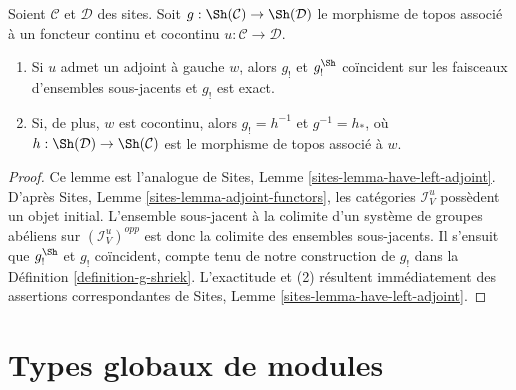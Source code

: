 \begin{lemma}
\label{lemma-have-left-adjoint}
Soient $\mathcal{C}$ et $\mathcal{D}$ des sites. Soit
$g : \Sh(\mathcal{C}) \to \Sh(\mathcal{D})$ le morphisme de topos associé à un
foncteur continu et cocontinu $u : \mathcal{C} \to \mathcal{D}$.
\begin{enumerate}
\item Si $u$ admet un adjoint à gauche $w$, alors $g_!$ et $g_!^{\Sh}$
coïncident sur les faisceaux d'ensembles sous-jacents et $g_!$ est exact.
\item Si, de plus, $w$ est cocontinu, alors $g_! = h^{-1}$ et
$g^{-1} = h_*$, où $h : \Sh(\mathcal{D}) \to \Sh(\mathcal{C})$ est le
morphisme de topos associé à $w$.
\end{enumerate}
\end{lemma}

\begin{proof}
Ce lemme est l'analogue de Sites, Lemme
\ref{sites-lemma-have-left-adjoint}. D'après Sites, Lemme
\ref{sites-lemma-adjoint-functors}, les catégories $\mathcal{I}_V^u$ possèdent
un objet initial. L'ensemble sous-jacent à la colimite d'un système de groupes
abéliens sur $(\mathcal{I}_V^u)^{opp}$ est donc la colimite des ensembles
sous-jacents. Il s'ensuit que $g_!^{\Sh}$ et $g_!$ coïncident, compte tenu de
notre construction de $g_!$ dans la Définition \ref{definition-g-shriek}.
L'exactitude et (2) résultent immédiatement des assertions correspondantes de
Sites, Lemme \ref{sites-lemma-have-left-adjoint}.
\end{proof}





\section{Types globaux de modules}
\label{section-global}

